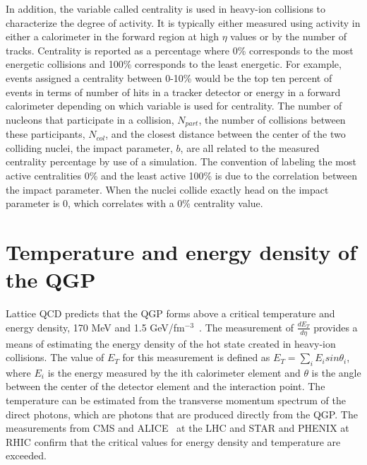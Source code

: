     In addition, the variable called centrality is used in heavy-ion 
      collisions to characterize the degree of activity. 
    It is typically either measured using activity in either a calorimeter in
      the forward region at high $\eta$ values or by the number of tracks.
    Centrality is reported as a percentage where 0\% corresponds to the most 
      energetic collisions and 100\% corresponds to the least energetic.
    For example, events assigned a centrality between 0-10\% would be the 
      top ten percent of events in terms of number of hits in a tracker 
      detector or energy in a forward calorimeter depending on which 
      variable is used for centrality. 
    The number of nucleons that participate in a collision, $N_{part}$,
      the number of collisions between these participants, $N_{col}$, and the
      closest distance between the center of the two colliding nuclei, the 
      impact parameter, $b$, are all related to the measured centrality 
      percentage by use of a simulation. 
    The convention of labeling the most active centralities 0\% and the least
      active 100\% is due to the correlation between the impact parameter.
    When the nuclei collide exactly head on the impact parameter is 0, which 
      correlates with a 0\% centrality value. 

  \section{Temperature and energy density of the QGP}
    Lattice QCD predicts that the QGP forms above a critical temperature and 
      energy density, 170 MeV and 1.5 GeV/fm$^{-3}$~\cite{Karsch:2000kv,Hands:2001ve}.
    The measurement of $\frac{dE_{T}}{d\eta}$ provides a means of 
      estimating the energy density of the hot state created in heavy-ion
      collisions. 
    The value of $E_{T}$ for this measurement is defined as 
      $E_{T}=\sum_{i}E_{i}sin\theta_{i}$, where $E_{i}$ is the energy measured 
      by the ith calorimeter element and $\theta$ is the angle between the 
      center of the detector element and the interaction point. 
    The temperature can be estimated from the transverse momentum 
      spectrum of the direct photons, which are photons that are produced 
      directly from the QGP.
    The measurements from CMS and ALICE~\cite{Aamodt:2008zz} at the LHC and STAR and PHENIX at RHIC
      confirm that the critical values for energy density and temperature are
      exceeded.

